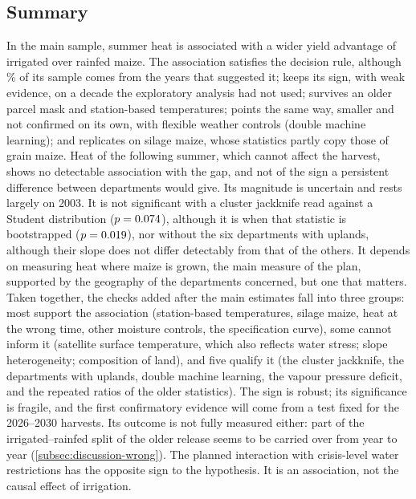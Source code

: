 \subsection{Summary}

In the main sample, summer heat is associated with a wider yield advantage of irrigated over rainfed maize. The association satisfies the decision rule, although \ExploSharePct\,\% of its sample comes from the years that suggested it; keeps its sign, with weak evidence, on a decade the exploratory analysis had not used; survives an older parcel mask and station-based temperatures; points the same way, smaller and not confirmed on its own, with flexible weather controls (double machine learning); and replicates on silage maize, whose statistics partly copy those of grain maize. Heat of the following summer, which cannot affect the harvest, shows no detectable association with the gap, and not of the sign a persistent difference between departments would give. Its magnitude is uncertain and rests largely on 2003. It is not significant with a cluster jackknife read against a Student distribution ($p = 0.074$), although it is when that statistic is bootstrapped ($p = 0.019$), nor without the six departments with uplands, although their slope does not differ detectably from that of the others. It depends on measuring heat where maize is grown, the main measure of the plan, supported by the geography of the departments concerned, but one that matters. Taken together, the checks added after the main estimates fall into three groups: most support the association (station-based temperatures, silage maize, heat at the wrong time, other moisture controls, the specification curve), some cannot inform it (satellite surface temperature, which also reflects water stress; slope heterogeneity; composition of land), and five qualify it (the cluster jackknife, the departments with uplands, double machine learning, the vapour pressure deficit, and the repeated ratios of the older statistics). The sign is robust; its significance is fragile, and the first confirmatory evidence will come from a test fixed for the 2026--2030 harvests. Its outcome is not fully measured either: part of the irrigated--rainfed split of the older release seems to be carried over from year to year (\cref{subsec:discussion-wrong}). The planned interaction with crisis-level water restrictions has the opposite sign to the hypothesis. It is an association, not the causal effect of irrigation.
